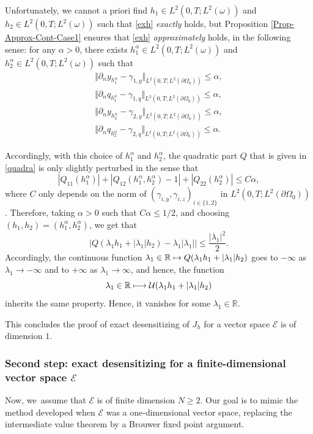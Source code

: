 \documentclass[11pt]{article}
\numberwithin{equation}{section}
\newcommand\mto{\mathchoice{\longmapsto}{\mapsto}{\mapsto}{\mapsto}}
\newcommand\R{{\mathbb R}}
\newcommand{\norm}[1]{\Vert#1\Vert}
\theoremstyle{definition}
\begin{document}
Unfortunately, we cannot a priori find $h_1\!\in\! L^2(0,T; L^2(\omega))$ and $h_2\!\in\! L^2(0,T; L^2(\omega))$ such that \eqref{exh} \textit{exactly} holds, but Proposition \ref{Prop-Approx-Cont-Case1} ensures that \eqref{exh} \textit{approximately} holds, in the following sense: for any ${\alpha}>0$, there exists $h_1^{\alpha} \in L^2(0,T; L^2(\omega))$ and $h_2^{\alpha} \in L^2(0,T; L^2(\omega))$ such that
\begin{equation*}
\begin{aligned}
\norm{\partial_{n} y_{h_1^{\alpha}}-\gamma_{1,y}}_{L^2(0,T; L^2(\partial \Omega_0))}\leqslant {\alpha},
\\
\norm{\partial_{n} q_{h_1^{\alpha}}-\gamma_{1,q}}_{L^2(0,T; L^2(\partial \Omega_0))}\leqslant {\alpha},
\\
\norm{\partial_{n} y_{h_2^{\alpha}}-\gamma_{2,y}}_{L^2(0,T; L^2(\partial \Omega_0))}\leqslant {\alpha},
\\
\norm{\partial_{n} q_{h_2^{\alpha}}-\gamma_{2,q}}_{L^2(0,T; L^2(\partial \Omega_0))}\leqslant {\alpha}.
\end{aligned}
\end{equation*}

Accordingly, with this choice of $h_1^{\alpha}$ and $h_2^{\alpha}$, the quadratic part $Q$ that is given in \eqref{quadra} is only slightly perturbed in the sense that
\[
|Q_{11}(h_1^{\alpha})| +|Q_{12}(h_1^{\alpha},h_2^{\alpha}) -1| + |Q_{22} (h_2^{\alpha})| \leq C {\alpha},
\]
where $C$ only depends on the norm of $(\gamma_{i,y}, \gamma_{i,z})_{i \in \{1,2\}}$ in $L^2(0,T; L^2(\partial \Omega_0))$. Therefore, taking ${\alpha} >0$ such that $C {\alpha} \leq 1/2$, and choosing $(h_1, h_2) = (h_1^{\alpha}, h_2^{\alpha})$, we get that
\[
|Q(\lambda_1h_1 +|\lambda_1|h_2) - \lambda_1 |\lambda_1| | \leq \frac{|\lambda_1|^2}{2}.
\]
Accordingly, the continuous function $\lambda_1 \in \R \mto Q(\lambda_1h_1 +|\lambda_1|h_2)$ goes to $-\infty$ as $\lambda_1 \to -\infty$ and to $+ \infty$ as $\lambda_1 \to \infty$, and hence, the function
\[
\lambda_1 \in \R \mto \mathcal{U}(\lambda_1 h_1+|\lambda_1| h_2)
\]
inherits the same property. Hence, it vanishes for some $\lambda_1 \in \R$.

This concludes the proof of exact desensitizing of $J_h$ for a vector space $\mathcal{E}$ is of dimension $1$.

\subsubsection*{Second step: exact desensitizing for a finite-dimensional vector space $\mathcal{E}$} Now, we~assu\-me that $\mathcal{E}$ is of finite dimension $N\geqslant 2$. Our goal is to mimic the method developed when $\mathcal{E}$ was a one-dimensional vector space, replacing the intermediate value theorem by a Brouwer fixed point argument.
\end{document}

